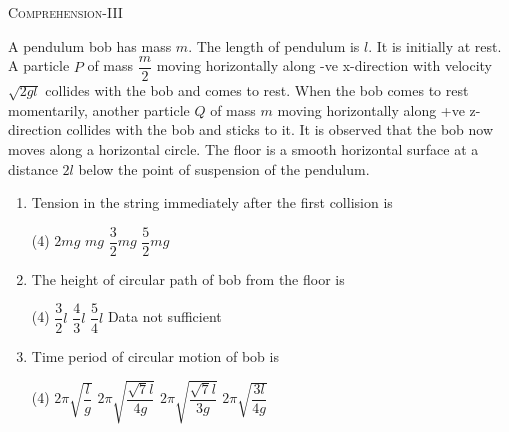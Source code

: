 \begin{center}
    \textsc{Comprehension-III}
\end{center}
A pendulum bob has mass $m$. The length of pendulum is $l$. It is initially at rest. A particle $P$ of mass $\dfrac{m}{2}$ moving horizontally along -ve x-direction with velocity $\sqrt{2gl}$ collides with the bob and comes to rest. When the bob comes to rest momentarily, another particle $Q$ of mass $m$ moving horizontally along +ve z-direction collides with the bob and sticks to it. It is observed that the bob now moves along a horizontal circle. The floor is a smooth horizontal surface at a distance $2l$ below the point of suspension of the pendulum. 
\begin{center}
\end{center} 
\begin{enumerate}
    \item Tension in the string immediately after the first collision is
        \begin{tasks}(4)
            \task $2mg$
            \task $mg$
            \task $\dfrac{3}{2}mg$\ans
            \task $\dfrac{5}{2}mg$
        \end{tasks}

    \item The height of circular path of bob from the floor is
        \begin{tasks}(4)
            \task $\dfrac{3}{2}l$
            \task $\dfrac{4}{3}l$
            \task $\dfrac{5}{4}l$\ans
            \task Data not sufficient
        \end{tasks}

    \item Time period of circular motion of bob is
        \begin{tasks}(4)
            \task $2\pi\sqrt{\dfrac{l}{g}}$
            \task $2\pi\sqrt{\dfrac{\sqrt{7}l}{4g}}$
            \task $2\pi\sqrt{\dfrac{\sqrt{7}l}{3g}}$
            \task $2\pi\sqrt{\dfrac{3l}{4g}}$\ans
        \end{tasks} 
\end{enumerate}
